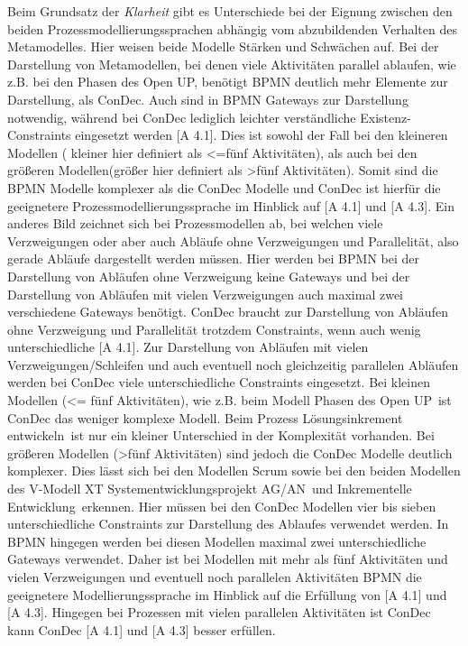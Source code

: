 {Beim Grundsatz der \textit{Klarheit} gibt es Unterschiede bei der Eignung zwischen den beiden Prozessmodellierungssprachen abhängig vom abzubildenden Verhalten des Metamodelles. Hier weisen beide Modelle Stärken und Schwächen auf. \newline
Bei der Darstellung von Metamodellen, bei denen viele Aktivitäten parallel ablaufen, wie z.B. bei den Phasen des Open UP, benötigt BPMN deutlich mehr Elemente zur Darstellung, als ConDec. Auch sind in BPMN Gateways zur Darstellung notwendig, während bei ConDec lediglich leichter verständliche Existenz-Constraints eingesetzt werden [A 4.1]. Dies ist sowohl der Fall bei den kleineren Modellen ( kleiner hier definiert als <=fünf Aktivitäten), als auch bei den größeren Modellen(größer hier definiert als >fünf Aktivitäten). Somit sind die BPMN Modelle komplexer als die ConDec Modelle und ConDec ist hierfür die geeignetere Prozessmodellierungssprache im Hinblick auf [A 4.1] und [A 4.3]. \newline
Ein anderes Bild zeichnet sich bei Prozessmodellen ab, bei welchen viele Verzweigungen oder aber auch Abläufe ohne Verzweigungen und Parallelität, also gerade Abläufe dargestellt werden müssen. Hier werden bei BPMN bei der Darstellung von Abläufen ohne Verzweigung keine Gateways und bei der Darstellung von Abläufen mit vielen Verzweigungen auch maximal zwei verschiedene Gateways benötigt. ConDec braucht zur Darstellung von Abläufen ohne Verzweigung und Parallelität trotzdem Constraints, wenn auch wenig unterschiedliche [A 4.1]. Zur Darstellung von Abläufen mit vielen Verzweigungen/Schleifen und auch eventuell noch gleichzeitig parallelen Abläufen werden bei ConDec viele unterschiedliche Constraints eingesetzt. Bei kleinen Modellen (<= fünf Aktivitäten), wie z.B. beim Modell \grqq Phasen des Open UP\grqq \ ist ConDec das weniger komplexe Modell. Beim Prozess \grqq Lösungsinkrement entwickeln\grqq \ ist nur ein kleiner Unterschied in der Komplexität vorhanden. Bei größeren Modellen (>fünf Aktivitäten) sind jedoch die ConDec Modelle deutlich komplexer. Dies lässt sich bei den Modellen Scrum sowie bei den beiden Modellen des V-Modell XT \grqq Systementwicklungsprojekt AG/AN\grqq \ und \grqq Inkrementelle Entwicklung\grqq \ erkennen. Hier müssen bei den ConDec Modellen vier bis sieben unterschiedliche Constraints zur Darstellung des Ablaufes verwendet werden. In BPMN hingegen werden bei diesen Modellen maximal zwei unterschiedliche Gateways verwendet. Daher ist bei Modellen mit mehr als fünf Aktivitäten und vielen Verzweigungen und eventuell noch parallelen Aktivitäten BPMN die geeignetere Modellierungssprache im Hinblick auf die Erfüllung von [A 4.1] und [A 4.3]. Hingegen bei Prozessen mit vielen parallelen Aktivitäten ist ConDec kann ConDec [A 4.1] und [A 4.3] besser erfüllen.\newline

}

